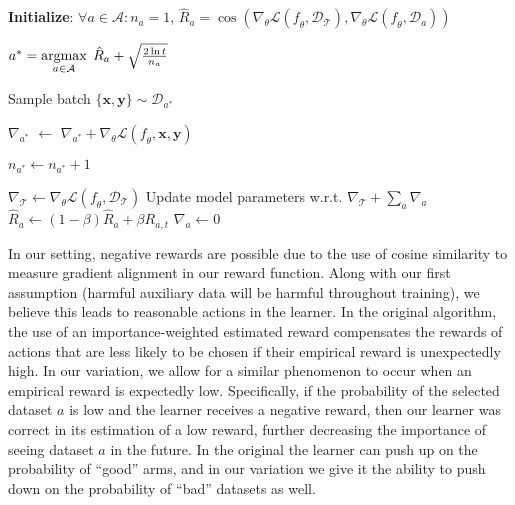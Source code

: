 \begin{algorithm}[t]
\begin{algorithmic}[1]
\STATE \textbf{Initialize}:
\STATEX $\forall a\in\mathcal{A}: n_{a} = 1$,
\STATEX \qquad\qquad$\hat{R}_{a} = \cos(\nabla_{\theta}\mathcal{L}(\mathit{f}_{\theta},\mathcal{D}_{\mathcal{T}}),\nabla_{\theta}\mathcal{L}(\mathit{f}_{\theta},\mathcal{D}_{a}))$ 

    
    \STATE $a^{*} = \argmax_{a\in\mathcal{A}}\;\hat{R}_{a} + \sqrt{\frac{2\ln{t}}{n_{a}}}$

    \STATE Sample batch $\{\mathbf{x},\mathbf{y}\}\sim \mathcal{D}_{a^{*}}$

    \STATE $\nabla_{a^{*}}$ $\gets$ $\nabla_{a^{*}}+\nabla_{\theta}\mathcal{L}(\mathit{f}_{\theta},\mathbf{x},\mathbf{y})$%

    \STATE $n_{a^{*}} \gets n_{a^{*}} + 1$

        \STATE $\nabla_{\mathcal{T}}\gets\nabla_{\theta}\mathcal{L}(\mathit{f}_{\theta},\mathcal{D}_{\mathcal{T}})$ %
        \STATE Update model parameters w.r.t. $\nabla_{\mathcal{T}}+\sum_{a}\nabla_{a}$
            \STATE $\hat{R}_{a} \gets (1-\beta)\hat{R}_{a} + \beta R_{a,t}$
            \STATE $\nabla_{a}\gets 0$ %
        \ENDFOR
    \ENDIF
\ENDFOR


\end{algorithmic}
\end{algorithm}

In our setting, negative rewards are possible due to the use of cosine similarity to measure gradient alignment in our reward function.
Along with our first assumption (harmful auxiliary data will be harmful throughout training), we believe this leads to reasonable actions in the learner. In the original \ex{} algorithm, the use of an importance-weighted estimated reward compensates the rewards of actions that are less likely to be chosen if their empirical reward is unexpectedly high. In our variation, we allow for a similar phenomenon to occur when an empirical reward is expectedly low. Specifically, if the probability of the selected dataset $a$ is low and the learner receives a negative reward, then our learner was correct in its estimation of a low reward, further decreasing the importance of seeing dataset $a$ in the future. In the original \ex{} the learner can push up on the probability of ``good'' arms, and in our variation we give it the ability to push down on the probability of ``bad'' datasets as well.

